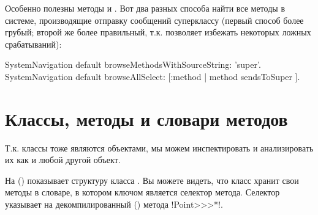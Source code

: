 \documentclass[a4paper,10pt,twoside]{book}
\begin{document}
Особенно полезны методы  и . Вот два разных способа найти все методы в системе, производящие отправку сообщений суперклассу (первый способ более грубый; второй же более правильный, т.к. позволяет избежать некоторых ложных срабатываний):
\begin{code}{}
SystemNavigation default browseMethodsWithSourceString: 'super'.
SystemNavigation default browseAllSelect: [:method | method sendsToSuper ].
\end{code}

\section{Классы, методы и словари методов}

Т.к. классы тоже являются объектами, мы можем инспектировать и анализировать их как и любой другой объект.


На   () показывает структуру класса .
Вы можете видеть, что класс хранит свои методы в словаре, в котором ключом является селектор метода.
Селектор \ct{#*} указывает на декомпилированный  () метода \ct!Point>>>*!.
\end{document}
